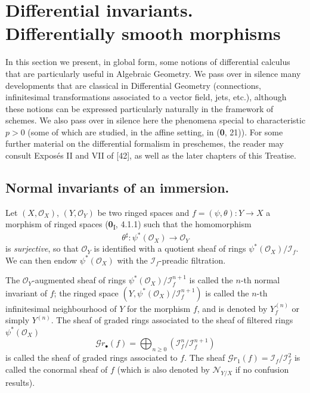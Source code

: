 \section{Differential invariants. Differentially smooth morphisms}
\label{section:IV.16}

In this section we present, in global form, some notions of
differential calculus that are particularly useful in Algebraic Geometry. We pass
over in silence many developments that are classical in Differential Geometry (connections,
infinitesimal transformations associated to a vector field, jets, etc.), although these
notions can be expressed particularly naturally in the framework of schemes. We
also pass over in silence here the phenomena special to characteristic $p>0$
(some of which are studied, in the affine setting, in (\textbf{0}, 21)). For some further
material on the differential formalism in preschemes, the reader may consult
Exposés II and VII of [42], as well as the later chapters of this Treatise.

\subsection{Normal invariants of an immersion.}

\begin{env}[16.1.1]
\label{IV.16.1.1}
Let $(X,\mathcal{O}_X)$, $(Y,\mathcal{O}_Y)$ be two ringed spaces and
$f=(\psi,\theta):Y\to X$ a morphism of ringed spaces (\textbf{0}\textsubscript{I}, 4.1.1)
such that the homomorphism
\[
  \theta^\sharp:\psi^*(\mathcal{O}_X)\longrightarrow\mathcal{O}_Y
\]
is \emph{surjective}, so that $\mathcal{O}_Y$ is identified with a quotient sheaf of rings
$\psi^*(\mathcal{O}_X)/\mathscr{I}_f$. We can then endow
$\psi^*(\mathcal{O}_X)$ with the $\mathscr{I}_f$-preadic filtration.
\end{env}

\begin{definition}[16.1.2]\label{IV.16.1.2}
The $\mathcal{O}_Y$-augmented sheaf of rings
$\psi^*(\mathcal{O}_X)/\mathscr{I}_f^{n+1}$ is called the $n$-th \textup{normal invariant}
of $f$; the ringed space
$(Y,\psi^*(\mathcal{O}_X)/\mathscr{I}_f^{n+1})$ is called the $n$-th \textup{infinitesimal
neighbourhood of} $Y$ for the morphism $f$, and is denoted by $Y_f^{(n)}$ or simply
$Y^{(n)}$. The sheaf of graded rings associated to the sheaf of filtered rings
$\psi^*(\mathcal{O}_X)$
\[
  \mathscr{G}r_\bullet(f)=\bigoplus_{n\geq 0}
  (\mathscr{I}_f^n/\mathscr{I}_f^{n+1})
  \tag{16.1.2.1}
  \label{IV.16.1.2.1}
\]
is called the sheaf of graded rings \textup{associated to} $f$. The sheaf
$\mathscr{G}r_1(f)=\mathscr{I}_f/\mathscr{I}_f^2$ is called the \textup{conormal sheaf}
of $f$ \textup{(which is also denoted by $\mathscr{N}_{Y/X}$ if no confusion results)}.
\end{definition}

